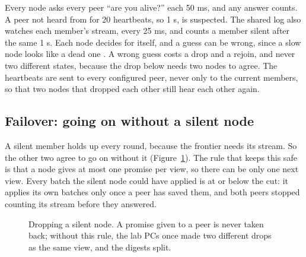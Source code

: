 Every node asks every peer ``are you alive?'' each 50 ms, and any answer counts. A peer not heard from for 20 heartbeats, so 1 s, is suspected. The shared log also watches each member's stream, every 25 ms, and counts a member silent after the same 1 s. Each node decides for itself, and a guess can be wrong, since a slow node looks like a dead one \cite{chandra}. A wrong guess costs a drop and a rejoin, and never two different states, because the drop below needs two nodes to agree. The heartbeats are sent to every configured peer, never only to the current members, so that two nodes that dropped each other still hear each other again.

\subsection{Failover: going on without a silent node}
\label{sec:drop}

A silent member holds up every round, because the frontier needs its stream. So the other two agree to go on without it (Figure~\ref{fig:seq-drop}). The rule that keeps this safe is that a node gives at most one promise per view, so there can be only one next view. Every batch the silent node could have applied is at or below the cut: it applies its own batches only once a peer has saved them, and both peers stopped counting its stream before they answered.

\begin{figure}[!htb]
\centering
{}
\caption{Dropping a silent node. A promise given to a peer is never taken back; without this rule, the lab PCs once made two different drops as the same view, and the digests split.}
\label{fig:seq-drop}
\end{figure}

